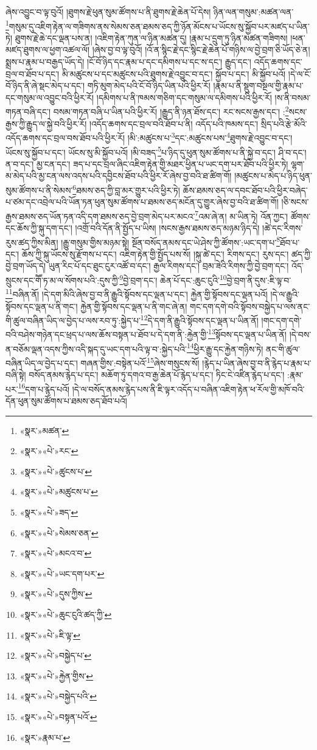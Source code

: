 ཞེས་འབྱུང་བ་ལྟ་བུའོ། །ཐུགས་རྗེ་ཕུན་སུམ་ཚོགས་པ་ནི་ཐུགས་རྗེ་ཆེན་པོ་དེས། ཉིན་ལན་གསུམ་:མཚན་ལན་\footnote{«སྣར་»མཚན་}གསུམ་དུ་འཇིག་རྟེན་ལ་གཟིགས་ནས་སེམས་ཅན་ཐམས་ཅད་ཀྱི་ཉོན་མོངས་པ་ཡོངས་སུ་སྐྱོབ་པར་མཛད་པ་ཡིན་ཏེ། ཐུགས་རྗེ་ཆེ་དང་ལྡན་པས་ན། །འཇིག་རྟེན་ཀུན་ལ་ཉིན་མཚན་དུ། །རྣམ་པ་དྲུག་ཏུ་ཉིན་མཚན་གཟིགས། །ཕན་མཛད་ཐུགས་ལ་ཕྱག་འཚལ་ལོ། །ཞེས་བྱ་བ་ལྟ་བུའོ། །འོ་ན་སྙིང་རྗེ་དང་སྙིང་རྗེ་ཆེན་པོ་གཉིས་ལ་བྱེ་བྲག་ཅི་ཡོད་ཅེ་ན། སྨྲས་པ་རྣམ་པ་བརྒྱད་ཡོད་དེ། །ངོ་བོ་ཉིད་དང་རྣམ་པ་དང་དམིགས་པ་དང་ས་དང་། རྒྱུད་དང་། འདོད་ཆགས་དང་བྲལ་བ་ཐོབ་པ་དང་། མི་མཚུངས་པ་དང་མཚུངས་པའི་ཐུགས་རྗེ་འབྱུང་བ་དང་། སྐྱོབ་པ་དང་། མི་སྐྱོབ་པའོ། །དེ་ལ་ངོ་བོ་ཉིད་ནི་ཞེ་སྡང་མེད་པ་དང་། གཏི་མུག་མེད་པའི་ངོ་བོ་ཉིད་ཡིན་པའི་ཕྱིར་རོ། །རྣམ་པ་ནི་སྡུག་བསྔལ་གྱི་རྣམ་པ་དང་གསུམ་ལ་འབྱུང་བའི་ཕྱིར་རོ། །དམིགས་པ་ནི་ཁམས་གཅིག་དང་གསུམ་ལ་དམིགས་པའི་ཕྱིར་རོ། །ས་ནི་བསམ་གཏན་བཞི་དང་། བསམ་གཏན་བཞི་པ་ཡིན་པའི་ཕྱིར་རོ། །རྒྱུད་ནི་ཉན་ཐོས་དང་། རང་སངས་རྒྱས་དང་། :\footnote{«སྣར་»«པེ་»རང་}སངས་རྒྱས་ཀྱི་རྒྱུད་ལ་སྐྱེ་བའི་ཕྱིར་རོ། །འདོད་ཆགས་དང་བྲལ་བའི་ཐོབ་པ་ནི། འདོད་པའི་ཁམས་དང་། སྲིད་པའི་རྩེ་མོའི་འདོད་ཆགས་དང་བྲལ་བས་ཐོབ་པའི་ཕྱིར་རོ། །མི་:མཚུངས་པ་\footnote{«སྣར་»«པེ་»ཚུངས་པ་}དང་:མཚུངས་པས་\footnote{«སྣར་»«པེ་»མཚུངས་པ་}ཐུགས་རྗེ་འབྱུང་བ་དང་། ཡོངས་སུ་སྐྱོབ་པ་དང་། ཡོངས་སུ་མི་སྐྱོབ་པའོ། །མི་བཟད་\footnote{«སྣར་»«པེ་»ཟད་}པ་ཉིད་དུ་ཕུན་སུམ་ཚོགས་པ་ནི་སྐྱེ་བ་དང་། ཤི་བ་དང་། ན་བ་དང་། མྱ་ངན་དང་། ཟད་པ་དང་བྲལ་ཞིང་འཇིག་རྟེན་གྱི་མཐར་ཕྱིན་པ་ཡང་དག་པར་ཐོབ་པའི་ཕྱིར་ཏེ། ལྷག་མ་མེད་པའི་མྱ་ངན་ལས་འདས་པའི་དབྱིངས་ཐོབ་པའི་ཕྱིར་རོ་ཞེས་བྱ་བའི་ཐ་ཚིག་གོ། །མཚུངས་པ་མེད་པ་ཉིད་ཕུན་སུམ་ཚོགས་པ་ནི་སེམས་\footnote{«སྣར་»«པེ་»སེམས་ཅན་}ཐམས་ཅད་ཀྱི་བླ་མར་གྱུར་པའི་ཕྱིར་ཏེ། ཆོས་ཐམས་ཅད་ལ་དབང་ཐོབ་པའི་ཕྱིར་བཞེད་པ་ཙམ་དང་འབྲེལ་པའི་ཡོན་ཏན་ཕུན་སུམ་ཚོགས་པ་ཐམས་ཅད་མངོན་དུ་གྱུར་ཞེས་བྱ་བའི་ཐ་ཚིག་གོ། །ཅི་སངས་རྒྱས་ཐམས་ཅད་ཡོན་ཏན་འདི་དག་ཐམས་ཅད་བྱེ་བྲག་མེད་པར་མངའ་\footnote{«སྣར་»«པེ་»མངའ་བ་}འམ་ཞེ་ན། མ་ཡིན་ཏེ། འོན་ཀྱང་། ཚོགས་དང་ཆོས་ཀྱི་སྐུ་དག་དང་། །འགྲོ་བའི་དོན་ནི་སྤྱོད་པ་ཡིས། །སངས་རྒྱས་ཐམས་ཅད་མཉམ་ཉིད་དེ། །ཚེ་དང་རིགས་རུས་ཚད་ཀྱིས་མིན། །རྒྱུ་གསུམ་གྱིས་མཉམ་སྟེ། སྔོན་བསོད་ནམས་དང་ཡེ་ཤེས་ཀྱི་ཚོགས་:ཡང་དག་པ་\footnote{«སྣར་»«པེ་»ཡང་དག་པར་}ཐོབ་པ་དང་། ཆོས་ཀྱི་སྐུ་ཡོངས་སུ་རྫོགས་པ་དང་། འཇིག་རྟེན་གྱི་སྤྱོད་པས་སོ། །སྐུ་ཚེ་དང་། རིགས་དང་། རུས་དང་། ཚད་ཀྱི་བྱེ་བྲག་ཡོད་དེ། ཡུན་རིང་པོ་དང་ཐུང་ངུར་འཚོ་བ་དང་། རྒྱལ་རིགས་དང་། བྲམ་ཟེའི་རིགས་ཀྱི་བྱེ་བྲག་དང་། འོད་སྲུངས་དང་གཽ་ཏ་མ་ལ་སོགས་པའི་:དུས་ཀྱི་\footnote{«སྣར་»«པེ་»དུས་ཀྱིས་}བྱེ་བྲག་དང་། ཆེན་པོ་དང་:ཆུང་ངུའི་\footnote{«སྣར་»«པེ་»ཆུང་ངུའི་ཚད་ཀྱི་}བྱེ་བྲག་ནི་དུས་:ཇི་ལྟ་བ་\footnote{«སྣར་»«པེ་»ཇི་ལྟ་}བཞིན་ནོ། །དེ་དག་མིའི་ཞེས་བྱ་བ་ནི་རྒྱུའི་སྟོབས་དང་ལྡན་པ་དང་། རྐྱེན་གྱི་སྟོབས་དང་ལྡན་པའོ། །དེ་ལ་རྒྱུའི་སྟོབས་དང་ལྡན་པ་ནི་གང་། རྐྱེན་གྱི་སྟོབས་དང་ལྡན་པ་ནི་གང་ཞེ་ན། གང་དག་དགེ་བའི་སྟོབས་བསྐྱེད་པ་ལས་ནང་གི་ཚུལ་བཞིན་ཡིད་ལ་བྱེད་པ་ལས་རབ་ཏུ་:སྐྱེད་པ་\footnote{«སྣར་»«པེ་»བསྐྱེད་པ་}དེ་དག་ནི་རྒྱུའི་སྟོབས་དང་ལྡན་པ་ཡིན་ནོ། །གང་དག་དགེ་བའི་བཤེས་གཉེན་དང་ཕྲད་པ་ལས་ཆོས་བསྟན་པ་ཐོབ་པ་དེ་དག་ནི་:རྐྱེན་གྱི་\footnote{«སྣར་»«པེ་»རྐྱེན་གྱིས་}སྟོབས་དང་ལྡན་པ་ཡིན་ནོ། །དེ་བས་ན་བཅོམ་ལྡན་འདས་ཀྱིས་འདི་སྐད་དུ་ཡང་དག་པའི་ལྟ་བ་:སྐྱེད་པའི་\footnote{«སྣར་»«པེ་»བསྐྱེད་པའི་}ཕྱིར་རྒྱུ་དང་རྐྱེན་གཉིས་ཏེ། ནང་གི་ཚུལ་བཞིན་ཡིད་ལ་བྱེད་པ་དང་། གཞན་གྱིས་:བསྟེན་པའོ་\footnote{«སྣར་»«པེ་»བསྟན་པའོ་}ཞེས་གསུངས་སོ། །རྙེད་པ་ཡིན་ཞེས་བྱ་བ་ནི་རྙེད་པ་རྣམ་པ་བཞི་སྟེ། བསོད་ནམས་རྙེད་པ་དང་། མཆོག་ཏུ་དགའ་བ་རྒྱ་ཆེན་པོ་རྙེད་པ་དང་། ཏིང་ངེ་འཛིན་རྙེད་པ་དང་། :རྣམ་པར་\footnote{«སྣར་»རྣམ་པ་}དག་པ་རྙེད་པའོ། །དེ་ལ་བསོད་ནམས་རྙེད་པས་ནི་ཇི་ལྟར་འདོད་པ་བཞིན་འཇིག་རྟེན་ཕ་རོལ་གྱི་མཁོ་བའི་དོན་ཕུན་སུམ་ཚོགས་པ་ཐམས་ཅད་ཐོབ་པའོ། 